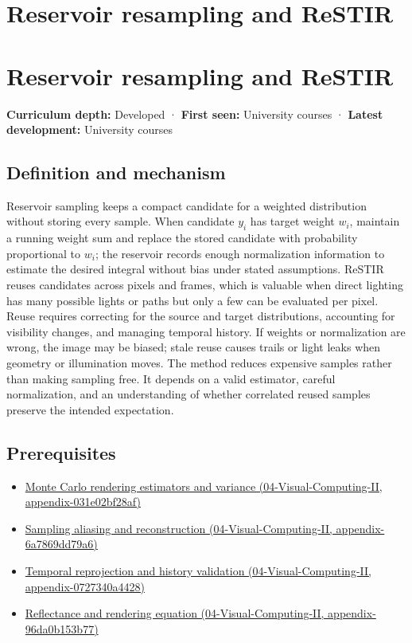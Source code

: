 \hypertarget{appendix-68be451b78b1}{}
\section*{Reservoir resampling and ReSTIR}
\section{Reservoir resampling and ReSTIR}\label{reservoir-resampling-and-restir}

\textbf{Curriculum depth:} Developed · \textbf{First seen:} University courses · \textbf{Latest development:} University courses

\subsection{Definition and mechanism}\label{definition-and-mechanism}

Reservoir sampling keeps a compact candidate for a weighted distribution without storing every sample. When candidate \(y_i\) has target weight \(w_i\), maintain a running weight sum and replace the stored candidate with probability proportional to \(w_i\); the reservoir records enough normalization information to estimate the desired integral without bias under stated assumptions. ReSTIR reuses candidates across pixels and frames, which is valuable when direct lighting has many possible lights or paths but only a few can be evaluated per pixel. Reuse requires correcting for the source and target distributions, accounting for visibility changes, and managing temporal history. If weights or normalization are wrong, the image may be biased; stale reuse causes trails or light leaks when geometry or illumination moves. The method reduces expensive samples rather than making sampling free. It depends on a valid estimator, careful normalization, and an understanding of whether correlated reused samples preserve the intended expectation.

\subsection{Prerequisites}\label{prerequisites}

\begin{itemize}
\tightlist
\item
  \href{}{Monte Carlo rendering estimators and variance (04-Visual-Computing-II, appendix-031e02bf28af)}
\item
  \href{}{Sampling aliasing and reconstruction (04-Visual-Computing-II, appendix-6a7869dd79a6)}
\item
  \href{}{Temporal reprojection and history validation (04-Visual-Computing-II, appendix-0727340a4428)}
\item
  \href{}{Reflectance and rendering equation (04-Visual-Computing-II, appendix-96da0b153b77)}
\end{itemize}

